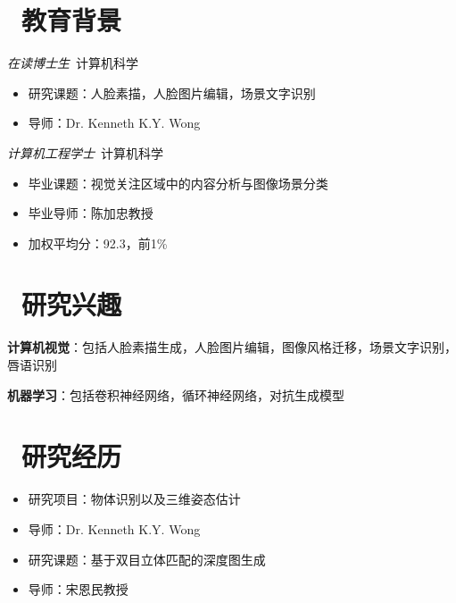 \documentclass{resume}
\begin{document}


 
\section{\faGraduationCap\  教育背景}
\textit{在读博士生}\ 计算机科学
\begin{itemize}
  \item 研究课题：人脸素描，人脸图片编辑，场景文字识别
  \item 导师：Dr. Kenneth K.Y. Wong
\end{itemize}
\textit{计算机工程学士}\ 计算机科学
\begin{itemize}
  \item 毕业课题：视觉关注区域中的内容分析与图像场景分类
  \item 毕业导师：陈加忠教授
  \item 加权平均分：92.3，前1\%
\end{itemize}

\section{\faHeart \ 研究兴趣}
\textbf{计算机视觉}：包括人脸素描生成，人脸图片编辑，图像风格迁移，场景文字识别，唇语识别

\textbf{机器学习}：包括卷积神经网络，循环神经网络，对抗生成模型

\section{\faUsers\ 研究经历}
\begin{itemize}
  \item 研究项目：物体识别以及三维姿态估计
  \item 导师：Dr. Kenneth K.Y. Wong
\end{itemize}

\begin{itemize}
  \item 研究课题：基于双目立体匹配的深度图生成
  \item 导师：宋恩民教授
\end{itemize}
\end{document}
